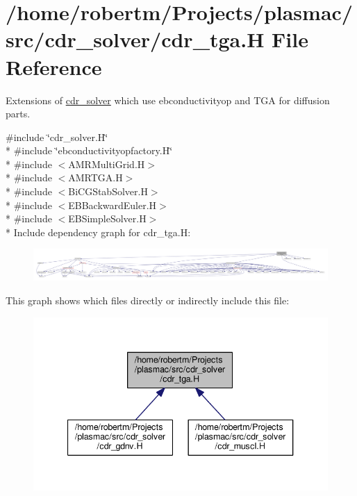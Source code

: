 \hypertarget{cdr__tga_8H}{}\section{/home/robertm/\+Projects/plasmac/src/cdr\+\_\+solver/cdr\+\_\+tga.H File Reference}
\label{cdr__tga_8H}


Extensions of \hyperlink{classcdr__solver}{cdr\+\_\+solver} which use ebconductivityop and T\+GA for diffusion parts.  


{\ttfamily \#include \char`\"{}cdr\+\_\+solver.\+H\char`\"{}}\\*
{\ttfamily \#include \char`\"{}ebconductivityopfactory.\+H\char`\"{}}\\*
{\ttfamily \#include $<$A\+M\+R\+Multi\+Grid.\+H$>$}\\*
{\ttfamily \#include $<$A\+M\+R\+T\+G\+A.\+H$>$}\\*
{\ttfamily \#include $<$Bi\+C\+G\+Stab\+Solver.\+H$>$}\\*
{\ttfamily \#include $<$E\+B\+Backward\+Euler.\+H$>$}\\*
{\ttfamily \#include $<$E\+B\+Simple\+Solver.\+H$>$}\\*
Include dependency graph for cdr\+\_\+tga.\+H\+:\nopagebreak
\begin{figure}[H]
\begin{center}
\leavevmode
\includegraphics[width=350pt]{cdr__tga_8H__incl}
\end{center}
\end{figure}
This graph shows which files directly or indirectly include this file\+:\nopagebreak
\begin{figure}[H]
\begin{center}
\leavevmode
\includegraphics[width=340pt]{cdr__tga_8H__dep__incl}
\end{center}
\end{figure}

